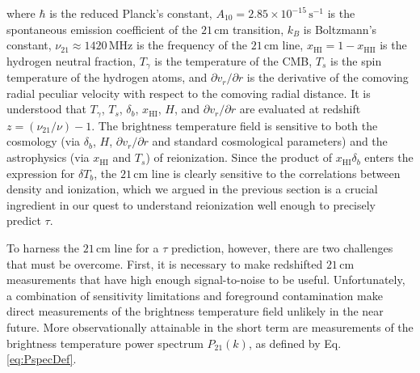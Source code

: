 \documentclass[twocolumn,aps,prd,nofootinbib,showpacs]{revtex4-1}
\begin{document}
where $\hbar$ is the reduced Planck's constant, $A_{10}=2.85\times10^{-15}\,\textrm{s}^{-1}$ is the spontaneous emission coefficient of the $21\,\textrm{cm}$ transition, $k_B$ is Boltzmann's constant, $\nu_\textrm{21} \approx 1420\,\textrm{MHz}$ is the frequency of the $21\,\textrm{cm}$ line, $x_\textrm{HI} = 1 - x_\textrm{HII}$ is the hydrogen neutral fraction, $T_\gamma$ is the temperature of the CMB, $T_s$ is the spin temperature of the hydrogen atoms, and $\partial v_r / \partial r$ is the derivative of the comoving radial peculiar velocity with respect to the comoving radial distance. It is understood that $T_\gamma$, $T_s$, $\delta_b$, $x_\textrm{HI}$, $H$, and $\partial v_r / \partial r$ are evaluated at redshift $z = (\nu_\textrm{21} / \nu ) -1$. The brightness temperature field is sensitive to both the cosmology (via $\delta_b$, $H$, $\partial v_r / \partial r$ and standard cosmological parameters) and the astrophysics (via $x_\textrm{HI}$ and $T_s$) of reionization. Since the product of $x_\textrm{HI} \delta_b$ enters the expression for $\delta T_b$, the $21\,\textrm{cm}$ line is clearly sensitive to the correlations between density and ionization, which we argued in the previous section is a crucial ingredient in our quest to understand reionization well enough to precisely predict $\tau$.

%

To harness the $21\,\textrm{cm}$ line for a $\tau$ prediction, however, there are two challenges that must be overcome. First, it is necessary to make redshifted $21\,\textrm{cm}$ measurements that have high enough signal-to-noise to be useful. Unfortunately, a combination of sensitivity limitations and foreground contamination make direct measurements of the brightness temperature field unlikely in the near future. More observationally attainable in the short term are measurements of the brightness temperature power spectrum $P_\textrm{21} (k)$, as defined by Eq. \eqref{eq:PspecDef}.
\end{document}
